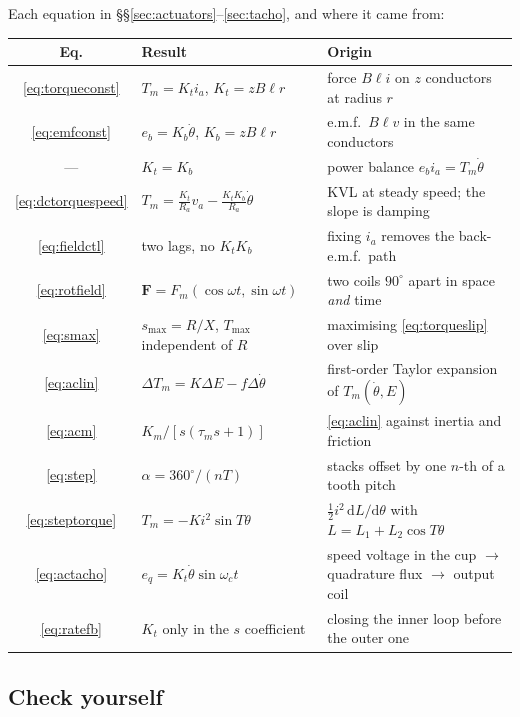\documentclass[11pt,a4paper]{article}
\begin{document}
\begin{keyidea}
Each equation in \S\S\ref{sec:actuators}--\ref{sec:tacho}, and where it came
from:
\begin{center}
\begin{tabular}{clP{6.5cm}}
\toprule
Eq. & Result & Origin \\
\midrule
\eqref{eq:torqueconst} & $T_{m}=K_{t}i_{a}$, $K_{t}=zB\ell r$
   & force $B\ell i$ on $z$ conductors at radius $r$ \\
\eqref{eq:emfconst} & $e_{b}=K_{b}\dot\theta$, $K_{b}=zB\ell r$
   & e.m.f.\ $B\ell v$ in the same conductors \\
--- & $K_{t}=K_{b}$
   & power balance $e_{b}i_{a}=T_{m}\dot\theta$ \\
\eqref{eq:dctorquespeed} & $T_{m}=\frac{K_{t}}{R_{a}}v_{a}-\frac{K_{t}K_{b}}{R_{a}}\dot\theta$
   & KVL at steady speed; the slope is damping \\
\eqref{eq:fieldctl} & two lags, no $K_{t}K_{b}$
   & fixing $i_{a}$ removes the back-e.m.f.\ path \\
\eqref{eq:rotfield} & $\mathbf{F}=F_{m}(\cos\omega t,\sin\omega t)$
   & two coils $90^\circ$ apart in space \emph{and} time \\
\eqref{eq:smax} & $s_{\max}=R/X$, $T_{\max}$ independent of $R$
   & maximising \eqref{eq:torqueslip} over slip \\
\eqref{eq:aclin} & $\Delta T_{m}=K\Delta E-f\Delta\dot\theta$
   & first-order Taylor expansion of $T_{m}(\dot\theta,E)$ \\
\eqref{eq:acm} & $K_{m}/[s(\tau_{m}s+1)]$
   & \eqref{eq:aclin} against inertia and friction \\
\eqref{eq:step} & $\alpha=360^\circ/(nT)$
   & stacks offset by one $n$-th of a tooth pitch \\
\eqref{eq:steptorque} & $T_{m}=-Ki^{2}\sin T\theta$
   & $\tfrac{1}{2}i^{2}\,\mathrm{d}L/\mathrm{d}\theta$ with $L=L_{1}+L_{2}\cos T\theta$ \\
\eqref{eq:actacho} & $e_{q}=K_{t}\dot\theta\sin\omega_{c}t$
   & speed voltage in the cup $\to$ quadrature flux $\to$ output coil \\
\eqref{eq:ratefb} & $K_{t}$ only in the $s$ coefficient
   & closing the inner loop before the outer one \\
\bottomrule
\end{tabular}
\end{center}
\end{keyidea}

\subsection*{Check yourself}
\end{document}
